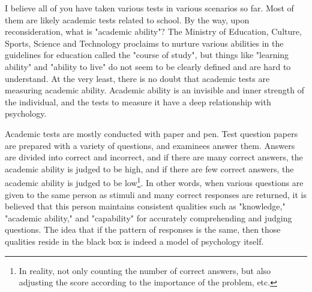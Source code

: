 \documentclass{ltjbook}
\begin{document}
I believe all of you have taken various tests in various scenarios so far. Most of them are likely academic tests related to school.
By the way, upon reconsideration, what is "academic ability"? The Ministry of Education, Culture, Sports, Science and Technology proclaims to nurture various abilities in the guidelines for education called the "course of study", but things like "learning ability" and "ability to live" do not seem to be clearly defined and are hard to understand.
At the very least, there is no doubt that academic tests are measuring academic ability. Academic ability is an invisible and inner strength of the individual, and the tests to measure it have a deep relationship with psychology.

Academic tests are mostly conducted with paper and pen. Test question papers are prepared with a variety of questions, and examinees answer them. Answers are divided into correct and incorrect, and if there are many correct answers, the academic ability is judged to be high, and if there are few correct answers, the academic ability is judged to be low\footnote{In reality, not only counting the number of correct answers, but also adjusting the score according to the importance of the problem, etc.}.
In other words, when various questions are given to the same person as stimuli and many correct responses are returned, it is believed that this person maintains consistent qualities such as "knowledge," "academic ability," and "capability" for accurately comprehending and judging questions. The idea that if the pattern of responses is the same, then those qualities reside in the black box is indeed a model of psychology itself.
\end{document}
